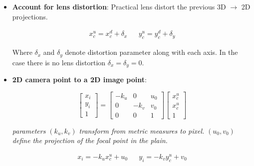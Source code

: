 \documentclass{article}
\begin{document}
\begin{itemize}
    \item \textbf{Account for lens distortion}:
    Practical lens distort the previous 3D $\rightarrow$ 2D projections.

    \begingroup
    \Large
    \begin{equation*}
        \begin{matrix}
            x_c^u = x_c^d + \delta_x & & y_c^u = y_c^d + \delta_y
        \end{matrix}
    \end{equation*}
    \endgroup

    Where $\delta_x$ and $\delta_y$ denote distortion parameter along with each axis. In the case there is no lens distortion $\delta_x = \delta_y = 0$.

    \item \textbf{2D camera point to a 2D image point}:

    \begin{equation*}
        \begin{bmatrix}
            x_i \\ y_i \\ 1
        \end{bmatrix} 
        = 
        \begin{bmatrix}
            -k_u & 0 & u_0 \\ 
            0 & -k_v & v_0 \\
            0 & 0 & 1
        \end{bmatrix}
        \begin{bmatrix}
            x_c^u \\ x_c^u \\ 1
        \end{bmatrix}
    \end{equation*}    

    \begin{center}
        \textit{parameters $(k_u, k_v)$ transform from metric measures to pixel.}
        \textit{$(u_0, v_0)$ define the projection of the focal point in the plain.}
    \end{center}

    \begingroup
    \Large
    \begin{equation*}
        \begin{matrix}
            x_i = -k_u x_c^u + u_0 & & y_i = -k_v y_c^u + v_0
        \end{matrix}
    \end{equation*}
    \endgroup
    
\end{itemize}
\end{document}
